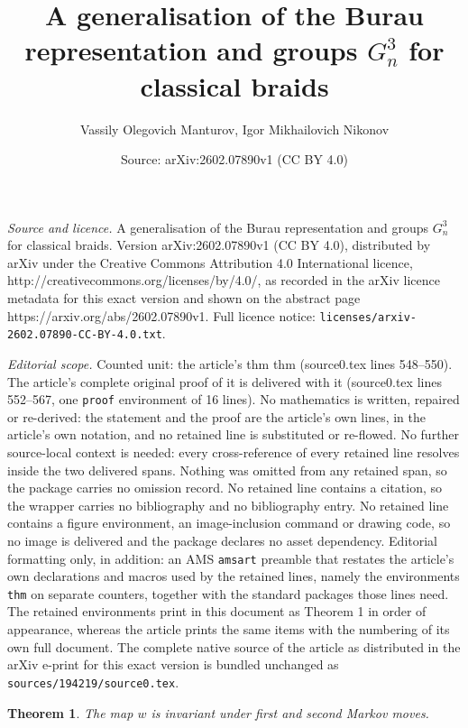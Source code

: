 \documentclass[10pt,a4paper]{amsart}
\title{A generalisation of the Burau representation and groups $G_{n}^{3}$ for classical braids}
\author{Vassily Olegovich Manturov, Igor Mikhailovich Nikonov}
\date{Source: arXiv:2602.07890v1 (CC BY 4.0)}
\newtheorem{thm}{Theorem}
\begin{document}
\maketitle

\noindent\emph{Source and licence.} A generalisation of the Burau representation and groups $G_{n}^{3}$ for classical braids. Version arXiv:2602.07890v1 (CC BY 4.0), distributed by arXiv under the Creative Commons Attribution 4.0 International licence, http://creativecommons.org/licenses/by/4.0/, as recorded in the arXiv licence metadata for this exact version and shown on the abstract page https://arxiv.org/abs/2602.07890v1. Full licence notice: \texttt{licenses/arxiv-2602.07890-CC-BY-4.0.txt}.\par\smallskip

\noindent\textit{Editorial scope.} Counted unit: the article's thm thm (source0.tex lines 548--550). The article's complete original proof of it is delivered with it (source0.tex lines 552--567, one \texttt{proof} environment of 16 lines). No mathematics is written, repaired or re-derived: the statement and the proof are the article's own lines, in the article's own notation, and no retained line is substituted or re-flowed.  No further source-local context is needed: every cross-reference of every retained line resolves inside the two delivered spans.  Nothing was omitted from any retained span, so the package carries no omission record.  No retained line contains a citation, so the wrapper carries no bibliography and no bibliography entry.  No retained line contains a figure environment, an image-inclusion command or drawing code, so no image is delivered and the package declares no asset dependency.  Editorial formatting only, in addition: an AMS \texttt{amsart} preamble that restates the article's own declarations and macros used by the retained lines, namely the environments \texttt{thm} on separate counters, together with the standard packages those lines need.  The retained environments print in this document as Theorem 1 in order of appearance, whereas the article prints the same items with the numbering of its own full document.  The complete native source of the article as distributed in the arXiv e-print for this exact version is bundled unchanged as \texttt{sources/194219/source0.tex}.
\begin{thm}
    The map $w$ is invariant under first and second Markov moves.
\end{thm}
\end{document}

